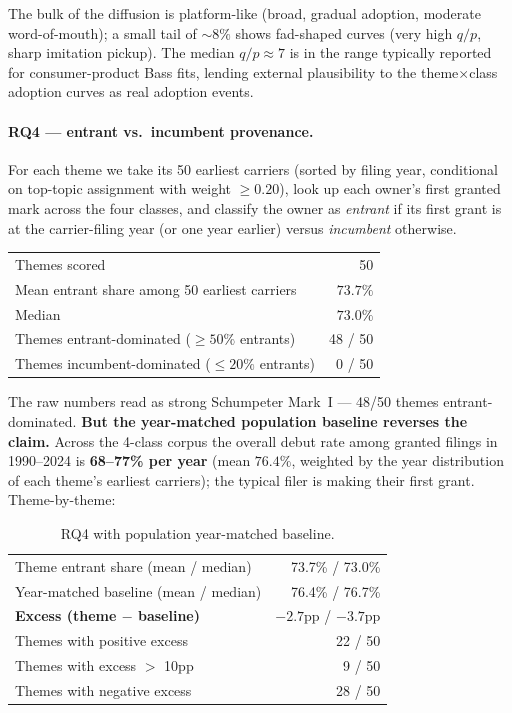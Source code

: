 \documentclass[11pt]{report}
\begin{document}
\noindent The bulk of the diffusion is platform-like (broad, gradual adoption,
moderate word-of-mouth); a small tail of $\sim 8\%$ shows fad-shaped curves
(very high $q/p$, sharp imitation pickup). The median $q/p \approx 7$ is in
the range typically reported for consumer-product Bass fits, lending external
plausibility to the theme$\times$class adoption curves as real adoption events.

\paragraph{RQ4 --- entrant vs.\ incumbent provenance.} For each theme we take
its 50 earliest carriers (sorted by filing year, conditional on top-topic
assignment with weight $\geq 0.20$), look up each owner's first granted mark
across the four classes, and classify the owner as \emph{entrant} if its first
grant is at the carrier-filing year (or one year earlier) versus
\emph{incumbent} otherwise.

\begin{table}[h]\centering\small
\begin{tabular}{lr}
\toprule
Themes scored                                    & 50 \\
Mean entrant share among 50 earliest carriers   & $73.7\%$ \\
Median                                            & $73.0\%$ \\
Themes entrant-dominated ($\geq 50\%$ entrants) & 48 / 50 \\
Themes incumbent-dominated ($\leq 20\%$ entrants) & 0 / 50 \\
\bottomrule
\end{tabular}
\end{table}

\noindent The raw numbers read as strong Schumpeter Mark~I --- 48/50 themes
entrant-dominated. \textbf{But the year-matched population baseline reverses
the claim.} Across the 4-class corpus the overall debut rate among granted
filings in 1990--2024 is \textbf{68--77\% per year} (mean $76.4\%$, weighted by
the year distribution of each theme's earliest carriers); the typical filer is
making their first grant. Theme-by-theme:

\begin{table}[h]\centering\small
\caption{RQ4 with population year-matched baseline.}
\begin{tabular}{lr}
\toprule
Theme entrant share (mean / median)              & 73.7\% / 73.0\% \\
Year-matched baseline (mean / median)            & 76.4\% / 76.7\% \\
\textbf{Excess (theme $-$ baseline)} & $\mathbf{-2.7}$pp / $-3.7$pp \\
Themes with positive excess                       & 22 / 50 \\
Themes with excess $>$ 10pp                       & 9 / 50 \\
Themes with negative excess                       & 28 / 50 \\
\bottomrule
\end{tabular}
\end{table}
\end{document}
